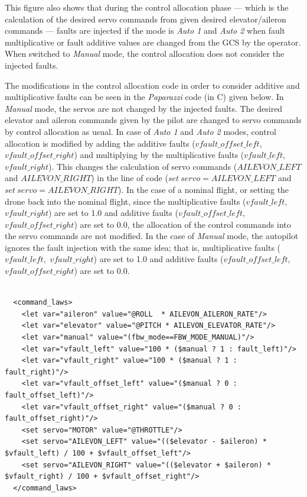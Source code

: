 This figure also shows that during the control allocation phase --- which is the calculation of the desired servo commands from given desired elevator/aileron commands --- faults are injected if the mode is \emph{Auto 1} and \emph{Auto 2} when fault multiplicative or fault additive values are changed from the GCS by the operator.  When switched to \emph{Manual} mode, the control allocation does not consider the injected faults. 

The modifications in the control allocation code in order to consider additive and multiplicative faults can be seen in the \emph{Paparazzi} code (in C) given below. In \emph{Manual} mode, the servos are not changed by the injected faults. The desired elevator and aileron commands given by the pilot are changed to servo commands by control allocation as usual. In case of \emph{Auto 1} and \emph{Auto 2} modes, control allocation is modified by adding the additive faults ($vfault\_offset\_left$,$vfault\_offset\_right$) and multiplying by the multiplicative faults ($vfault\_left$,\ $vfault\_right$). This changes the calculation of servo commands ($AILEVON\_{LEFT}$ and $AILEVON\_{RIGHT}$) in the line of code ($set \ servo = AILEVON\_{LEFT}$ and $set \ servo = AILEVON\_{RIGHT}$). In the case of a nominal flight, or setting the drone back into the nominal flight, since the multiplicative faults ($vfault\_left$,\ $vfault\_right$) are set to 1.0 and additive faults ($vfault\_offset\_left$,$vfault\_offset\_right$) are set to 0.0, the allocation of the control commands into the servo commands are not modified. In the case of \emph{Manual} mode, the autopilot ignores the fault injection with the same idea; that is, multiplicative faults ($vfault\_left$,\ $vfault\_right$) are set to 1.0 and additive faults ($vfault\_offset\_left$, \\ $vfault\_offset\_right$) are set to 0.0.


\lstset{language=C}
\begin{lstlisting}

  <command_laws>
    <let var="aileron" value="@ROLL  * AILEVON_AILERON_RATE"/>
    <let var="elevator" value="@PITCH * AILEVON_ELEVATOR_RATE"/>
    <let var="manual" value="(fbw_mode==FBW_MODE_MANUAL)"/>
    <let var="vfault_left" value="100 * ($manual ? 1 : fault_left)"/>
    <let var="vfault_right" value="100 * ($manual ? 1 : fault_right)"/>
    <let var="vfault_offset_left" value="($manual ? 0 : fault_offset_left)"/>
    <let var="vfault_offset_right" value="($manual ? 0 : fault_offset_right)"/>
    <set servo="MOTOR" value="@THROTTLE"/>
    <set servo="AILEVON_LEFT" value="(($elevator - $aileron) * $vfault_left) / 100 + $vfault_offset_left"/>
    <set servo="AILEVON_RIGHT" value="(($elevator + $aileron) * $vfault_right) / 100 + $vfault_offset_right"/>
  </command_laws>
  
\end{lstlisting}


